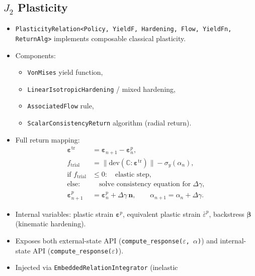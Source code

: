 \subsection{$J_2$ Plasticity}

\begin{itemize}
  \item \texttt{PlasticityRelation<Policy, YieldF, Hardening, Flow,
        YieldFn, ReturnAlg>} implements composable classical plasticity.
  \item Components:
    \begin{itemize}
      \item \texttt{VonMises} yield function,
      \item \texttt{LinearIsotropicHardening} / mixed hardening,
      \item \texttt{AssociatedFlow} rule,
      \item \texttt{ScalarConsistencyReturn} algorithm (radial return).
    \end{itemize}
  \item Full return mapping:
        \begin{align}
          \boldsymbol{\varepsilon}^{\text{tr}}
            &= \boldsymbol{\varepsilon}_{n+1}
              - \boldsymbol{\varepsilon}^p_n, \\
          f_{\text{trial}}
            &= \|\text{dev}(\mathbb{C}:\boldsymbol{\varepsilon}^{\text{tr}})\|
              - \sigma_y(\alpha_n), \\
          \text{if } f_{\text{trial}} &\le 0:
            \quad \text{elastic step}, \\
          \text{else}: &\quad \text{solve consistency equation for}
            \;\Delta\gamma, \\
          \boldsymbol{\varepsilon}^p_{n+1}
            &= \boldsymbol{\varepsilon}^p_n
              + \Delta\gamma \, \mathbf{n},
            \qquad \alpha_{n+1} = \alpha_n + \Delta\gamma.
        \end{align}
  \item Internal variables: plastic strain
        $\boldsymbol{\varepsilon}^p$, equivalent plastic strain
        $\bar{\varepsilon}^p$, backstress $\boldsymbol{\beta}$
        (kinematic hardening).
  \item Exposes both external-state API
        (\texttt{compute\_response($\varepsilon$, $\alpha$)}) and
        internal-state API (\texttt{compute\_response($\varepsilon$)}).
  \item Injected via \texttt{EmbeddedRelationIntegrator} (inelastic

\end{itemize}

